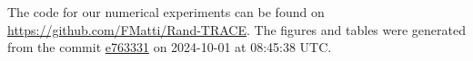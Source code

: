 The code for our numerical experiments can be found on \url{https://github.com/FMatti/Rand-TRACE}. The figures and tables were generated from the commit \href{https://github.com/FMatti/Rand-TRACE/tree/e763331}{e763331} on 2024-10-01 at 08:45:38 UTC.

